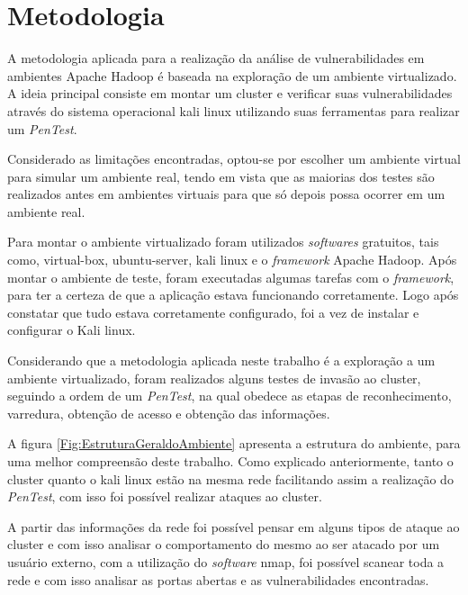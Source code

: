 \section{Metodologia}

A metodologia aplicada para a realização da análise de vulnerabilidades em ambientes Apache Hadoop é baseada na exploração de um ambiente virtualizado. A ideia principal consiste em montar um cluster e verificar suas vulnerabilidades através do sistema operacional kali linux utilizando suas ferramentas para realizar um \textit{PenTest}.

Considerado as limitações encontradas, optou-se por escolher um ambiente virtual para simular um ambiente real, tendo em vista que as maiorias dos testes são realizados antes em ambientes virtuais para que só depois possa ocorrer em um ambiente real.

Para montar o ambiente virtualizado foram utilizados \textit{softwares} gratuitos, tais como, virtual-box, ubuntu-server, kali linux e o \textit{framework} Apache Hadoop. Após montar o ambiente de teste, foram executadas algumas tarefas com o \textit{framework}, para ter a certeza de que a aplicação estava funcionando corretamente. Logo após constatar que tudo estava corretamente configurado, foi a vez de instalar e configurar o Kali linux.

Considerando que a metodologia aplicada neste trabalho é a exploração a um ambiente virtualizado, foram realizados alguns testes de invasão ao cluster, seguindo a ordem de um \textit{PenTest}, na qual obedece as etapas de reconhecimento, varredura, obtenção de acesso e obtenção das informações.

A figura \ref{Fig:EstruturaGeraldoAmbiente} apresenta a estrutura do ambiente, para uma melhor compreensão deste trabalho. Como explicado anteriormente, tanto o cluster quanto o kali linux estão na mesma rede facilitando assim a realização do \textit{PenTest}, com isso foi possível realizar ataques ao cluster.

A partir das informações da rede foi possível pensar em alguns tipos de ataque ao cluster e com isso analisar o comportamento do mesmo ao ser atacado por um usuário externo, com a utilização do \textit{software} nmap, foi possível scanear toda a rede e com isso analisar as portas abertas e as vulnerabilidades encontradas.

